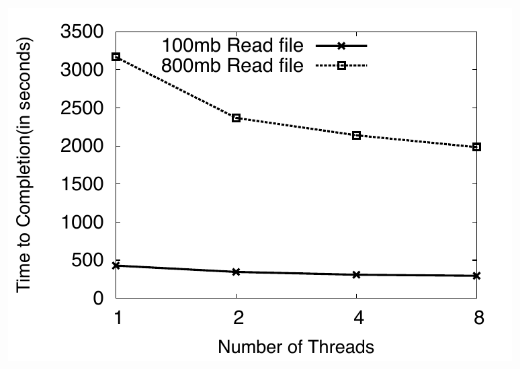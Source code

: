 \documentclass{article}
\begin{document}
\includegraphics[scale=0.66]{../figures/cloud_threadsvstime.pdf} 
\end{document}

